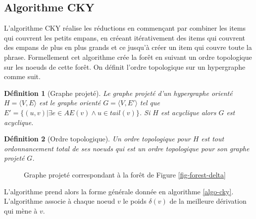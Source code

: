 \documentclass[11pt,openany]{book}
\newtheorem{definition}{Définition}[chapter]
\begin{document}
\subsection{Algorithme CKY}

L'algorithme CKY réalise les réductions en commençant par combiner les items qui couvrent les petits empans, en créeant itérativement des items qui 
couvrent des empans de plus en plus grands et ce jusqu'à créer un item qui couvre toute la phrase.
Formellement cet algorithme crée la forêt en suivant un ordre topologique sur les noeuds de cette forêt.
On définit l'ordre topologique sur un hypergraphe comme suit.

\begin{definition}[Graphe projeté]
Le graphe projeté d'un hypergraphe orienté $H=\langle V, E\rangle$ est le graphe orienté $G=\langle V,E'\rangle$
tel que $E' = \{(u,v) | \exists e \in AE(v) \land u \in tail(v) \}$. Si $H$ est acyclique alors $G$ est acyclique.
\end{definition}

\begin{definition}[Ordre topologique]
Un ordre topologique pour $H$ est tout ordonnancement total de ses noeuds 
qui est un ordre topologique pour son graphe projeté $G$.
\end{definition}

\begin{figure}[htbp]
\begin{center}
\caption{Graphe projeté correspondant à la forêt de Figure \ref{fig-forest-delta}}
\end{center}
\end{figure}

L'algorithme prend alors la forme générale donnée en algorithme \ref{algo-cky}.
L'algorithme associe à chaque noeud $v$ le poids $\delta(v)$ de la meilleure dérivation qui mène à $v$.
\end{document}
